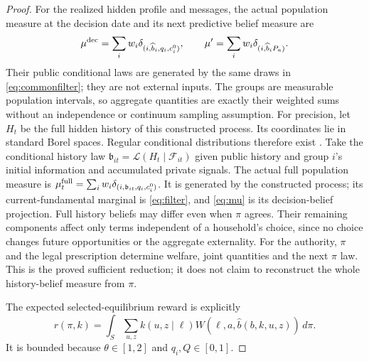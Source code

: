 \documentclass[11pt,a4paper]{article}
\newcommand{\Law}{\mathcal L}
\newcommand{\cF}{\mathcal F}
\newcommand{\dd}{\,d}
\begin{document}
\begin{proof}
For the realized hidden profile and messages, the actual population measure
at the decision date and its next predictive belief measure are
\begin{equation}\label{eq:mu}
 \mu^{\rm dec}=\sum_iw_i\delta_{(i,\widehat b_i,q_i,c_i^0)},
 \qquad \mu'=\sum_iw_i\delta_{(i,\widehat b_iP_a)}.
\end{equation}
Their public conditional laws are generated by the same draws in
\eqref{eq:commonfilter}; they are not external inputs. The groups are
measurable population intervals, so aggregate quantities are exactly their
weighted sums without an independence or continuum sampling assumption.
For precision, let $H_t$ be the full hidden history of this constructed process.
Its coordinates lie in standard Borel spaces. Regular conditional
distributions therefore exist \cite[Theorems 2.1.22 and 4.1.17]{durrett}.
Take the conditional history law
$\mathfrak b_{it}=\Law(H_t\mid\cF_{it})$ given public history and group $i$'s
initial information and accumulated private signals. The actual full
population measure is
$\mu_t^{\rm full}=\sum_iw_i\delta_{(i,\mathfrak b_{it},q_i,c_i^0)}$.
It is generated by the constructed process; its current-fundamental marginal
is \eqref{eq:filter}, and \eqref{eq:mu} is its decision-belief projection.
Full history beliefs may differ even when $\pi$ agrees. Their remaining
components affect only terms independent of a household's choice, since no
choice changes future opportunities or the aggregate externality. For the
authority, $\pi$ and the legal prescription determine welfare, joint quantities
and the next $\pi$ law. This is the proved sufficient reduction; it does not
claim to reconstruct the whole history-belief measure from $\pi$.

The expected selected-equilibrium reward is explicitly
\begin{equation}\label{eq:reward}
 r(\pi,k)=\int_S\sum_{u,z}k(u,z\mid\ell)
               W(\ell,a,\widehat b(b,k,u,z))\dd\pi.
\end{equation}
It is bounded because $\theta\in[1,2]$ and $q_i,Q\in[0,1]$.


\end{proof}
\end{document}
